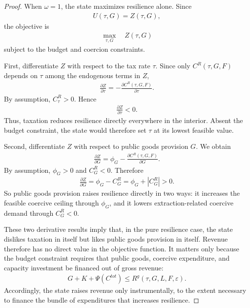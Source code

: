 \documentclass[12pt]{article}
\begin{document}
\begin{proof}
When $\omega=1$, the state maximizes resilience alone. Since
\begin{align}
U(\tau,G) = Z(\tau,G),
\end{align}
the objective is
\begin{align}
\max_{\tau,G} \quad Z(\tau,G)
\end{align}
subject to the budget and coercion constraints.

First, differentiate $Z$ with respect to the tax rate $\tau$. Since only $C^R(\tau,G,F)$ depends on $\tau$ among the endogenous terms in $Z$,
\begin{align}
\frac{\partial Z}{\partial \tau}
= - \frac{\partial C^R(\tau,G,F)}{\partial \tau}.
\end{align}
By assumption, $C^R_\tau>0$. Hence
\begin{align}
\frac{\partial Z}{\partial \tau} < 0.
\end{align}
Thus, taxation reduces resilience directly everywhere in the interior. Absent the budget constraint, the state would therefore set $\tau$ at its lowest feasible value.

Second, differentiate $Z$ with respect to public goods provision $G$. We obtain
\begin{align}
\frac{\partial Z}{\partial G}
= \phi_G - \frac{\partial C^R(\tau,G,F)}{\partial G}.
\end{align}
By assumption, $\phi_G>0$ and $C^R_G<0$. Therefore
\begin{align}
\frac{\partial Z}{\partial G}
= \phi_G - C^R_G
= \phi_G + |C^R_G|
> 0.
\end{align}
So public goods provision raises resilience directly in two ways: it increases the feasible coercive ceiling through $\phi_G$, and it lowers extraction-related coercive demand through $C^R_G<0$.

These two derivative results imply that, in the pure resilience case, the state dislikes taxation in itself but likes public goods provision in itself. Revenue therefore has no direct value in the objective function. It matters only because the budget constraint requires that public goods, coercive expenditure, and capacity investment be financed out of gross revenue:
\begin{align}
G + K + \Psi(C^{tot}) \le R^g(\tau,G,L,F,\varepsilon).
\end{align}
Accordingly, the state raises revenue only instrumentally, to the extent necessary to finance the bundle of expenditures that increases resilience.


\end{proof}
\end{document}
